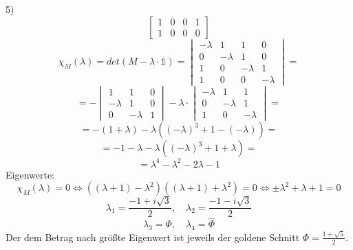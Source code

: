 \begin{paragraph}{5)}
\[\begin{bmatrix}
                         1 & 0 & 0 & 1 \\ 1 & 0 & 0 & 0 \end{bmatrix} \]
  \[ \chi_M(\lambda) = det(M - \lambda \cdot \mathds{1})
     = \begin{vmatrix} -\lambda & 1 & 1 & 0 \\
                       0 & -\lambda & 1 & 0 \\
                       1 & 0 & -\lambda & 1 \\
                       1 & 0 & 0 & -\lambda \end{vmatrix} = \]
  \[ = -\begin{vmatrix} 1 & 1 & 0 \\ 
                        -\lambda & 1 & 0 \\
                        0 & -\lambda & 1 \end{vmatrix} - \lambda \cdot
        \begin{vmatrix} -\lambda & 1 & 1 \\
                        0 & -\lambda & 1 \\
                        1 & 0 & -\lambda \end{vmatrix} = \]
  \[ = -(1 + \lambda) - \lambda ((-\lambda)^3 + 1 - (-\lambda)) = \]
  \[ = - 1 - \lambda - \lambda ((-\lambda)^3 + 1 + \lambda) = \]
  \[ = \lambda^4 - \lambda^2 - 2\lambda - 1 \]
  Eigenwerte:
  \[ \chi_M(\lambda) = 0 \Leftrightarrow 
     ((\lambda + 1) - \lambda^2)((\lambda + 1) + \lambda^2) = 0
     \Leftrightarrow \pm \lambda^2 + \lambda + 1 = 0 \]
  \[ \lambda_1 = \frac{-1 + i\sqrt{3}}{2}, \quad
     \lambda_2 = \frac{-1 - i\sqrt{3}}{2} \]
  \[ \lambda_3 = \Phi, \quad \lambda_4 = \hat \Phi \]
  Der dem Betrag nach größte Eigenwert ist jeweils der goldene Schnitt $\Phi =
  \frac{1 + \sqrt{5}}{2}$.
\end{paragraph}
